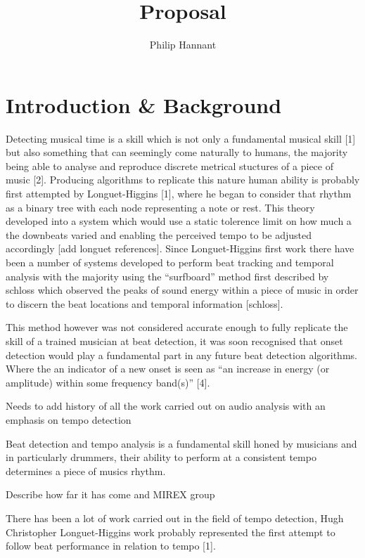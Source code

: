 \documentclass{article} \title{Proposal} \author{Philip Hannant}
\begin{document}
 \maketitle{} \section{Introduction \& Background}

Detecting musical time is a skill which is not only a fundamental musical skill [1] but also something that can seemingly come naturally to humans, the majority being able to analyse and reproduce discrete metrical stuctures of a piece of music [2]. Producing algorithms to replicate this nature human ability is probably first attempted by Longuet-Higgins [1], where he began to consider that rhythm as a binary tree with each node representing a note or rest. This theory developed into a system which would use a static tolerence limit on how much a the downbeats varied and enabling the perceived tempo to be adjusted accordingly [add longuet references]. Since Longuet-Higgins first work there have been a number of systems developed to perform beat tracking and temporal analysis with the majority using the ``surfboard'' method first described by schloss which observed the peaks of sound energy within a piece of music in order to discern the beat locations and temporal information [schloss]. 

This method however was not considered accurate enough to fully replicate the skill of a trained musician at beat detection, it was soon recognised that onset detection would play a fundamental part in any future beat detection algorithms. Where the an indicator of a new onset is seen as ``an increase in energy (or amplitude) within some frequency band(s)'' [4].




Needs to add history of all the work carried out on audio analysis with an emphasis on tempo detection

Beat detection and tempo analysis is a fundamental skill honed by musicians and in particularly drummers, their ability to perform at a consistent tempo determines a piece of musics rhythm. 

Describe how far it has come and MIREX group

There has been a lot of work carried out in the field of tempo detection, Hugh Christopher Longuet-Higgins work probably represented the first attempt to follow beat performance in relation to tempo [1]. 
\end{document}
